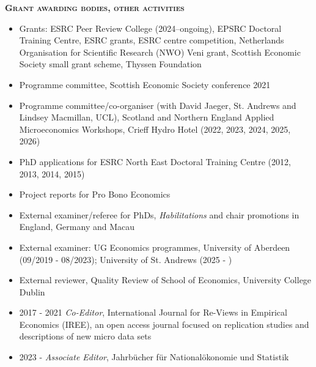 \documentclass[10pt,pdftex,a4paper,oneside]{article}
\begin{document}
\textbf{\textsc{Grant awarding bodies, other activities}}
\begin{itemize}[noitemsep,nolistsep]
\item[] Grants: ESRC Peer Review College (2024--ongoing), EPSRC Doctoral Training Centre, ESRC grants, ESRC centre competition, Netherlands Organisation for Scientific Research (NWO) Veni grant, Scottish Economic Society small grant scheme, Thyssen Foundation
\item[] Programme committee, Scottish Economic Society conference 2021
\item[] Programme committee/co-organiser (with David Jaeger, St. Andrews and Lindsey Macmillan, UCL), Scotland and Northern England Applied Microeconomics Workshops, Crieff Hydro Hotel (2022, 2023, 2024, 2025, 2026)
\item[] PhD applications for ESRC North East Doctoral Training Centre (2012, 2013, 2014, 2015)
\item[] Project reports for Pro Bono Economics
\item[] External examiner/referee for PhDs, \emph{Habilitations} and chair promotions in England, Germany and Macau
\item[] External examiner: UG Economics programmes, University of Aberdeen (09/2019 - 08/2023); University of St. Andrews (2025 - )
\item[] External reviewer, Quality Review of School of Economics, University College Dublin
\item[]2017 - 2021 \emph{Co-Editor}, International Journal for Re-Views in Empirical Economics (IREE), an open access journal focused on replication studies and descriptions of new micro data sets
\item[] 2023 - \emph{Associate Editor}, Jahrb{\"u}cher f{\"u}r National{\"o}konomie und Statistik
\end{itemize}
\end{document}
